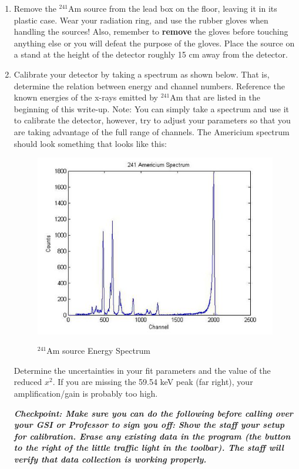 \documentclass{../lab}
\begin{document}
\begin{enumerate}
    \item Remove the $^{241}$Am source from the lead box on the floor, leaving it in its plastic case. Wear your radiation ring, and use the rubber gloves when handling the sources! Also, remember to \textbf{remove} the gloves before touching anything else or you will defeat the purpose of the gloves. Place the source on a stand at the height of the detector roughly 15 cm away from the detector.

    \item Calibrate your detector by taking a spectrum as shown below. That is, determine the relation between energy and channel numbers. Reference the known energies of the x-rays emitted by $^{241}$Am that are listed in the beginning of this write-up. Note: You can simply take a spectrum and use it to calibrate the detector, however, try to adjust your parameters so that you are taking advantage of the full range of channels. The Americium spectrum should look something that looks like this:
    \begin{figure}[h]
        \centering
        \href{http://experimentationlab.berkeley.edu/sites/default/files/images/550px-COMimage02.jpg}{\includegraphics[width=0.8\linewidth]{images/550px-COMimage02.jpg}}
        \caption{$^{241}$Am source Energy Spectrum}
        \label{fig:550px-COMimage02}
    \end{figure}
 
	Determine the uncertainties in your fit parameters and the value of the reduced $x^2$. If you are missing the 59.54 keV peak (far right), your amplification/gain is probably too high. 
	
	\emph{\textbf{Checkpoint: Make sure you can do the following before calling over your GSI or Professor to sign you off:
	Show the staff your setup for calibration. Erase any existing data in the program (the button to the right of the little traffic light in the toolbar). The staff will verify that data collection is working properly.}}


\end{enumerate}
\end{document}
